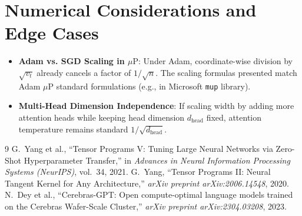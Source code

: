 \documentclass[11pt,a4paper]{article}
\theoremstyle{definition}
\begin{document}
\section{Numerical Considerations and Edge Cases}

\begin{itemize}
    \item \textbf{Adam vs. SGD Scaling in $\mu\text{P}$}: Under Adam, coordinate-wise division by $\sqrt{v_t}$ already cancels a factor of $1/\sqrt{n}$. The scaling formulas presented match Adam $\mu\text{P}$ standard formulations (e.g., in Microsoft \texttt{mup} library).
    \item \textbf{Multi-Head Dimension Independence}: If scaling width by adding more attention heads while keeping head dimension $d_{\text{head}}$ fixed, attention temperature remains standard $1/\sqrt{d_{\text{head}}}$.
\end{itemize}

\begin{thebibliography}{9}
 G.~Yang et al., ``Tensor Programs V: Tuning Large Neural Networks via Zero-Shot Hyperparameter Transfer,'' in \emph{Advances in Neural Information Processing Systems (NeurIPS)}, vol.~34, 2021.
 G.~Yang, ``Tensor Programs II: Neural Tangent Kernel for Any Architecture,'' \emph{arXiv preprint arXiv:2006.14548}, 2020.
 N.~Dey et al., ``Cerebras-GPT: Open compute-optimal language models trained on the Cerebras Wafer-Scale Cluster,'' \emph{arXiv preprint arXiv:2304.03208}, 2023.
\end{thebibliography}
\end{document}
